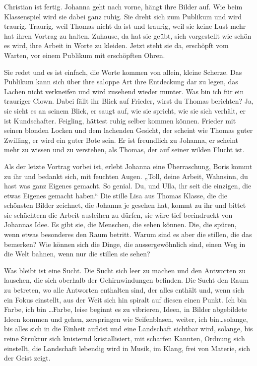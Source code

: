 \documentclass[10pt,a5paper]{book}
\begin{document}
Christian ist fertig. Johanna geht nach vorne, hängt ihre Bilder auf. Wie beim Klassenspiel wird sie dabei ganz ruhig. Sie dreht sich zum Publikum und wird traurig. Traurig, weil Thomas nicht da ist und traurig, weil sie keine Lust mehr hat ihren Vortrag zu halten. Zuhause, da hat sie geübt, sich vorgestellt wie schön es wird, ihre Arbeit in Worte zu kleiden. Jetzt steht sie da, erschöpft vom Warten, vor einem Publikum mit erschöpften Ohren.

Sie redet und es ist einfach, die Worte kommen von allein, kleine Scherze. Das Publikum kann sich über ihre saloppe Art ihre Entdeckung dar zu legen, das Lachen nicht verkneifen und wird zusehend wieder munter. Was bin ich für ein trauriger Clown. Dabei fällt ihr Blick auf Frieder, wirst du Thomas berichten? Ja, sie sieht es an seinem Blick, er saugt auf, wie sie spricht, wie sie sich verhält, er ist Kundschafter. Feigling, hättest ruhig selber kommen können. Frieder mit seinen blonden Locken und dem lachenden Gesicht, der scheint wie Thomas guter Zwilling, er wird ein guter Bote sein. Er ist freundlich zu Johanna, er scheint mehr zu wissen und zu verstehen, als Thomas, der auf seiner wilden Flucht ist.

Als der letzte Vortrag vorbei ist, erlebt Johanna eine Überraschung, Boris kommt zu ihr und bedankt sich, mit feuchten Augen. „Toll, deine Arbeit, Wahnsinn, du hast was ganz Eigenes gemacht. So genial. Du, und Ulla, ihr seit die einzigen, die etwas Eigenes gemacht haben.“ Die stille Lisa aus Thomas Klasse, die die schönsten Bilder zeichnet, die Johanna je gesehen hat, kommt zu ihr und bittet sie schüchtern die Arbeit ausleihen zu dürfen, sie wäre tief beeindruckt von Johannas Idee. Es gibt sie, die Menschen, die sehen können. Die, die spüren, wenn etwas besonderes den Raum betritt. Warum sind es aber die stillen, die das bemerken? Wie können sich die Dinge, die aussergewöhnlich sind, einen Weg in die Welt bahnen, wenn nur die stillen sie  sehen?

Was bleibt ist eine Sucht. Die Sucht sich leer zu machen und den Antworten zu lauschen, die sich oberhalb der Gehirnwindungen befinden. Die Sucht den Raum zu betreten, wo alle Antworten enthalten sind, der alles enthält und, wenn sich ein Fokus einstellt, aus der Weit sich hin spiralt auf diesen einen Punkt. 
Ich bin Farbe, ich bin \dots Farbe, leise beginnt es zu vibrieren, Ideen, in Bilder abgebildete Ideen kommen und gehen, zerspringen wie Seifenblasen, weiter, ich bin\dots  solange, bis alles sich in die Einheit auflöst und eine Landschaft sichtbar wird, solange, bis reine Struktur sich knisternd kristallisiert, mit scharfen Kannten, Ordnung sich einstellt, die Landschaft lebendig wird in Musik, im Klang, frei von Materie, sich der Geist zeigt. 
\end{document}
